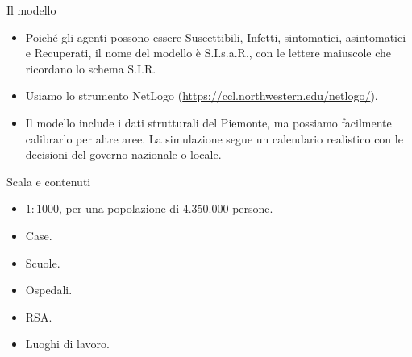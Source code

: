 \documentclass[]{beamer}
\begin{document}
\begin{frame}{Il modello}

\begin{itemize}

 \item
Poich\'{e} gli agenti possono essere Suscettibili, Infetti, sintomatici, asintomatici e Recuperati, il nome del modello \`{e} S.I.s.a.R., con le lettere maiuscole che ricordano lo schema S.I.R.

\item
Usiamo lo strumento NetLogo (\href{https://ccl.northwestern.edu/netlogo/}{https://ccl.northwestern.edu/netlogo/}).

\item
Il modello include i dati strutturali del Piemonte, ma possiamo facilmente calibrarlo per altre aree. La simulazione segue un calendario realistico con le decisioni del governo nazionale o locale.

\end{itemize}
\end{frame}

\begin{frame}{Scala e contenuti}

\begin{itemize}

\item $1:1000$, per una popolazione di 4.350.000 persone.

\bigskip

\item Case.
\item Scuole.
\item Ospedali.
\item RSA.
\item Luoghi di lavoro.

\end{itemize}

\end{frame}
\end{document}
